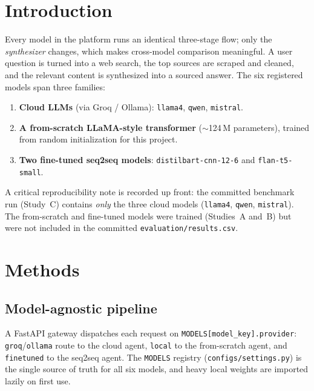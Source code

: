 \documentclass[11pt,a4paper]{article}
\begin{document}
\section{Introduction}
Every model in the platform runs an identical three-stage flow; only the
\emph{synthesizer} changes, which makes cross-model comparison meaningful. A
user question is turned into a web search, the top sources are scraped and
cleaned, and the relevant content is synthesized into a sourced answer. The six
registered models span three families:

\begin{enumerate}\itemsep2pt
  \item \textbf{Cloud LLMs} (via Groq / Ollama): \texttt{llama4}, \texttt{qwen},
        \texttt{mistral}.
  \item \textbf{A from-scratch LLaMA-style transformer} ($\sim$124\,M
        parameters), trained from random initialization for this project.
  \item \textbf{Two fine-tuned seq2seq models}:
        \texttt{distilbart-cnn-12-6} and \texttt{flan-t5-small}.
\end{enumerate}

\noindent
A critical reproducibility note is recorded up front: the committed benchmark
run (Study~C) contains \emph{only} the three cloud models
(\texttt{llama4}, \texttt{qwen}, \texttt{mistral}). The from-scratch and
fine-tuned models were trained (Studies~A and~B) but were not included in the
committed \texttt{evaluation/results.csv}.

\section{Methods}

\subsection{Model-agnostic pipeline}
A FastAPI gateway dispatches each request on
\texttt{MODELS[model\_key].provider}: \texttt{groq}/\texttt{ollama} route to the
cloud agent, \texttt{local} to the from-scratch agent, and \texttt{finetuned}
to the seq2seq agent. The \texttt{MODELS} registry
(\texttt{configs/settings.py}) is the single source of truth for all six
models, and heavy local weights are imported lazily on first use.
\end{document}

